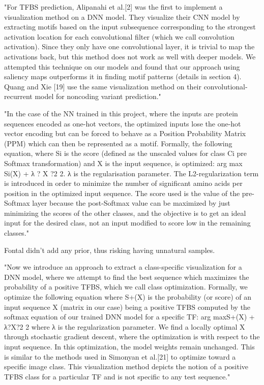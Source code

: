 		"For TFBS prediction, Alipanahi et al.[2] was the first to implement a visualization method on a DNN model. They visualize their CNN model by extracting motifs based on the input subsequence corresponding to the strongest activation location for each convolutional filter (which we call convolution activation). Since they only have one convolutional layer, it is trivial to map the activations back, but this method does not work as well with deeper models. We attempted this technique on our models and found that our approach using saliency maps outperforms it in finding motif patterns (details in section 4). Quang and Xie [19] use the same visualization method on their convolutional-recurrent model for noncoding variant prediction." \cite{Lanchantin2016}

		"In the case of the NN trained in this project, where the inputs are protein sequences encoded as one-hot vectors, the optimized inputs lose the one-hot vector encoding but can be forced to behave as a Position Probability Matrix (PPM) which can then be represented as a motif. Formally, the following equation, where Si is the score (defined as the unscaled values for class Ci pre Softmax transformation) and X is the input sequence, is optimized:
		arg max Si(X) + λ ? X ?2 2.
		λ is the regularisation parameter. The L2-regularization term is introduced in order to minimize the number of significant amino acids per position in the optimized input sequence. The score used is the value of the pre-Softmax layer because the post-Softmax value can be maximized by just minimizing the scores of the other classes, and the objective is to get an ideal input for the desired class, not an input modified to score low in the remaining classes." \cite{Fontal2017}
		
		Fontal didn't add any prior, thus risking having unnatural samples.
	
		"Now we introduce an approach to extract a class-specific visualization for a DNN model, where we attempt to find the best sequence which maximizes the probability of a positive TFBS, which we call class optimization. Formally, we optimize the following equation where S+(X) is the probability (or score) of an input sequence X (matrix in our case) being a positive TFBS computed by the softmax equation of our trained DNN model for a specific TF:
		arg maxS+(X) + λ?X?2 2
		where λ is the regularization parameter. We find a locally optimal X through stochastic gradient descent, where the optimization is with respect to the input sequence. In this optimization, the model weights remain unchanged. This is similar to the methods used in Simonyan et al.[21] to optimize toward a specific image class. This visualization method depicts the notion of a positive TFBS class for a particular TF and is not specific to any test sequence." \cite{Lanchantin2016}
		
